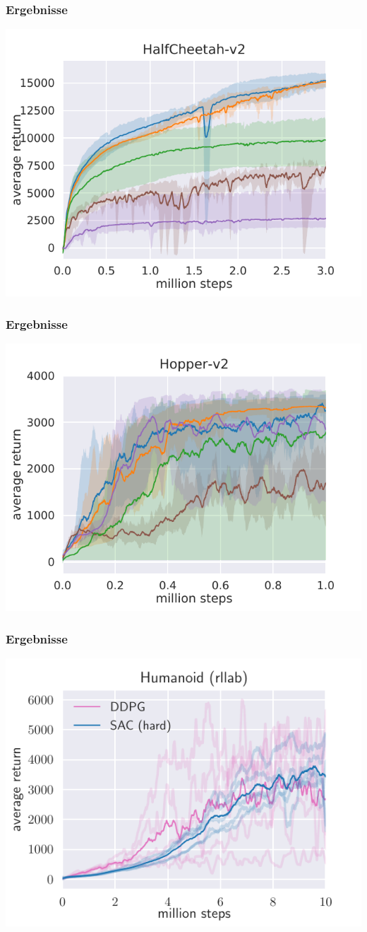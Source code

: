 \begin{frame}
    \frametitle{Ergebnisse}
    \includegraphics[scale=0.8]{figures/half-cheetah.pdf}
\end{frame}
\begin{frame}
    \frametitle{Ergebnisse}
    \includegraphics[scale=0.8]{figures/hopper.pdf}
\end{frame}
\begin{frame}
    \frametitle{Ergebnisse}
    \includegraphics[scale=0.8]{figures/seeds-humanoid.pdf}
\end{frame}
